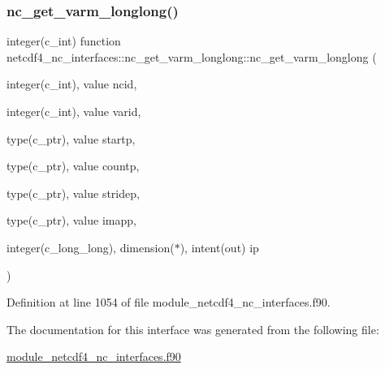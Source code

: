 \subsubsection{\texorpdfstring{nc\+\_\+get\+\_\+varm\+\_\+longlong()}{nc\_get\_varm\_longlong()}}
{\footnotesize\ttfamily integer(c\+\_\+int) function netcdf4\+\_\+nc\+\_\+interfaces\+::nc\+\_\+get\+\_\+varm\+\_\+longlong\+::nc\+\_\+get\+\_\+varm\+\_\+longlong (\begin{DoxyParamCaption}\item[{integer(c\+\_\+int), value}]{ncid,  }\item[{integer(c\+\_\+int), value}]{varid,  }\item[{type(c\+\_\+ptr), value}]{startp,  }\item[{type(c\+\_\+ptr), value}]{countp,  }\item[{type(c\+\_\+ptr), value}]{stridep,  }\item[{type(c\+\_\+ptr), value}]{imapp,  }\item[{integer(c\+\_\+long\+\_\+long), dimension($\ast$), intent(out)}]{ip }\end{DoxyParamCaption})}



Definition at line 1054 of file module\+\_\+netcdf4\+\_\+nc\+\_\+interfaces.\+f90.



The documentation for this interface was generated from the following file\+:\begin{DoxyCompactItemize}
\item 
\hyperlink{module__netcdf4__nc__interfaces_8f90}{module\+\_\+netcdf4\+\_\+nc\+\_\+interfaces.\+f90}\end{DoxyCompactItemize}
